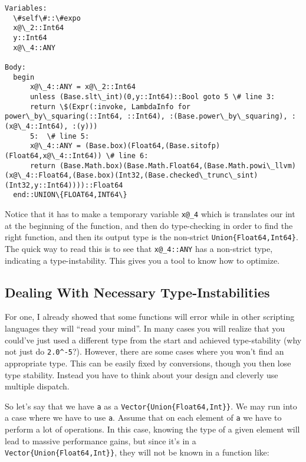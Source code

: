 \documentclass[11pt]{article}
\begin{document}
    \begin{Verbatim}[commandchars=\\\{\}]
Variables:
  \#self\#::\#expo
  x@\_2::Int64
  y::Int64
  x@\_4::ANY

Body:
  begin 
      x@\_4::ANY = x@\_2::Int64
      unless (Base.slt\_int)(0,y::Int64)::Bool goto 5 \# line 3:
      return \$(Expr(:invoke, LambdaInfo for power\_by\_squaring(::Int64, ::Int64), :(Base.power\_by\_squaring), :(x@\_4::Int64), :(y)))
      5:  \# line 5:
      x@\_4::ANY = (Base.box)(Float64,(Base.sitofp)(Float64,x@\_4::Int64)) \# line 6:
      return (Base.Math.box)(Base.Math.Float64,(Base.Math.powi\_llvm)(x@\_4::Float64,(Base.box)(Int32,(Base.checked\_trunc\_sint)(Int32,y::Int64))))::Float64
  end::UNION\{FLOAT64,INT64\}

    \end{Verbatim}

    Notice that it has to make a temporary variable \texttt{x@\_4} which is
translates our int at the beginning of the function, and then do
type-checking in order to find the right function, and then its output
type is the non-strict \texttt{Union\{Float64,Int64\}}. The quick way to
read this is to see that \texttt{x@\_4::ANY} has a non-strict type,
indicating a type-instability. This gives you a tool to know how to
optimize.

    \subsection{Dealing With Necessary
Type-Instabilities}\label{dealing-with-necessary-type-instabilities}

For one, I already showed that some functions will error while in other
scripting languages they will ``read your mind''. In many cases you will
realize that you could've just used a different type from the start and
achieved type-stability (why not just do \texttt{2.0\^{}-5}?). However,
there are some cases where you won't find an appropriate type. This can
be easily fixed by conversions, though you then lose type stability.
Instead you have to think about your design and cleverly use multiple
dispatch.

So let's say that we have \texttt{a} as a
\texttt{Vector\{Union\{Float64,Int\}\}}. We may run into a case where we
have to use \texttt{a}. Assume that on each element of \texttt{a} we
have to perform a lot of operations. In this case, knowing the type of a
given element will lead to massive performance gains, but since it's in
a \texttt{Vector\{Union\{Float64,Int\}\}}, they will not be known in a
function like:
\end{document}
